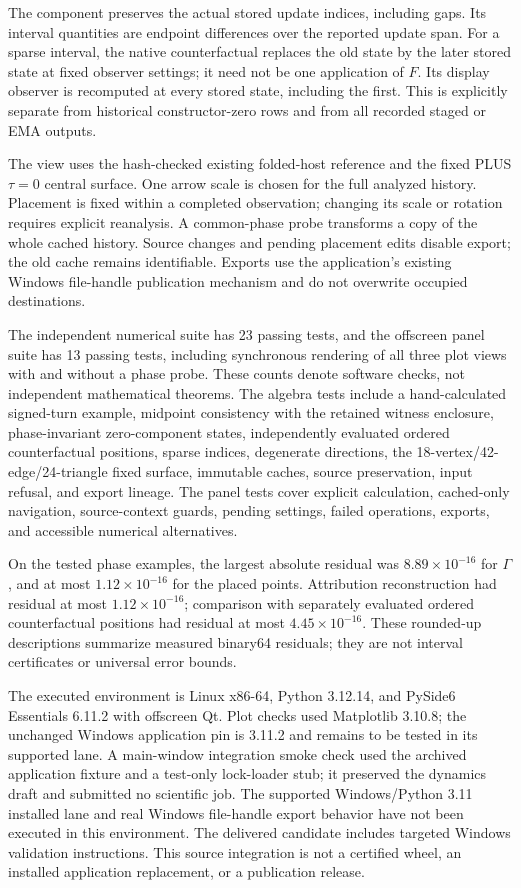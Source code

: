 \documentclass[11pt,a4paper]{article}
\numberwithin{equation}{section}
\theoremstyle{definition}
\theoremstyle{remark}
\begin{document}
The component preserves the actual stored update indices, including gaps.
Its interval quantities are endpoint differences over the reported update
span. For a sparse interval, the native counterfactual replaces the old
state by the later stored state at fixed observer settings; it need not be
one application of $F$. Its display observer is recomputed at every stored
state, including the first. This is explicitly separate from historical
constructor-zero rows and from all recorded staged or EMA outputs.

The view uses the hash-checked existing folded-host reference and the
fixed PLUS $\tau=0$ central surface. One arrow scale is chosen for the full
analyzed history. Placement is fixed within a completed observation;
changing its scale or rotation requires explicit reanalysis. A common-phase
probe transforms a copy of the whole cached history. Source changes and
pending placement edits disable export; the old cache remains identifiable.
Exports use the application's existing Windows file-handle publication
mechanism and do not overwrite occupied destinations.

The independent numerical suite has 23 passing tests, and the offscreen
panel suite has 13 passing tests, including synchronous rendering of all
three plot views with and without a phase probe. These counts denote
software checks, not independent mathematical theorems. The algebra tests
include a hand-calculated signed-turn example, midpoint consistency with
the retained witness enclosure, phase-invariant zero-component states,
independently evaluated ordered counterfactual positions, sparse indices,
degenerate directions, the 18-vertex/42-edge/24-triangle fixed surface,
immutable caches, source preservation, input refusal, and export lineage.
The panel tests cover explicit calculation, cached-only navigation,
source-context guards, pending settings, failed operations, exports, and
accessible numerical alternatives.

On the tested phase examples, the largest absolute residual was
$8.89\times10^{-16}$ for $\Gamma$, and at most $1.12\times10^{-16}$
for the placed points. Attribution reconstruction had residual at most
$1.12\times10^{-16}$; comparison with separately evaluated ordered
counterfactual positions had residual at most $4.45\times10^{-16}$.
These rounded-up descriptions summarize measured binary64 residuals;
they are not interval certificates or universal error bounds.

The executed environment is Linux x86-64, Python 3.12.14, and
PySide6 Essentials 6.11.2 with offscreen Qt. Plot checks used Matplotlib
3.10.8; the unchanged Windows application pin is 3.11.2 and remains to be
tested in its supported lane. A main-window integration
smoke check used the archived application fixture and a test-only lock-loader
stub; it preserved the dynamics draft and submitted no scientific job.
The supported Windows/Python 3.11 installed lane and real Windows
file-handle export behavior have not been executed in this environment.
The delivered candidate includes targeted Windows validation instructions.
This source integration is not a certified wheel, an installed application
replacement, or a publication release.
\end{document}
